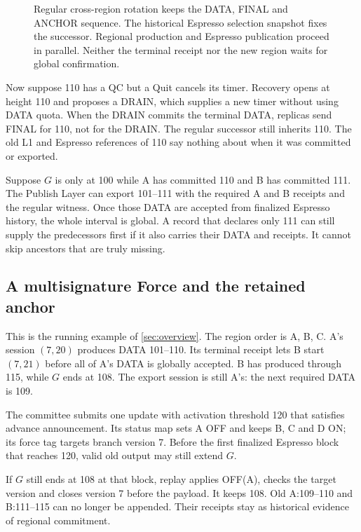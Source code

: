 \documentclass[11pt,a4paper]{article}
\begin{document}
\begin{figure}[htbp]\centering

\caption{Regular cross-region rotation keeps the DATA, FINAL and ANCHOR
sequence. The historical Espresso selection snapshot fixes the successor.
Regional production and Espresso publication proceed in parallel. Neither
the terminal receipt nor the new region waits for global confirmation.}
\label{fig:regular-cross-region}
\end{figure}
\FloatBarrier

Now suppose 110 has a QC but a Quit cancels its timer. Recovery opens at
height 110 and proposes a DRAIN, which supplies a new timer without using
DATA quota. When the DRAIN commits the terminal DATA, replicas send FINAL
for 110, not for the DRAIN. The regular successor still inherits 110. The
old L1 and Espresso references of 110 say nothing about when it was
committed or exported.

Suppose $G$ is only at 100 while A has committed 110 and B has committed
111. The Publish Layer can export 101--111 with the required A and B
receipts and the regular witness. Once those DATA are accepted from
finalized Espresso history, the whole interval is global. A record that
declares only 111 can still supply the predecessors first if it also
carries their DATA and receipts. It cannot skip ancestors that are truly
missing.

\subsection{A multisignature Force and the retained anchor}
\label{sec:force-example}
This is the running example of \cref{sec:overview}. The region order is
A, B, C. A's session $(7,20)$ produces DATA 101--110. Its terminal receipt
lets B start $(7,21)$ before all of A's DATA is globally accepted. B has
produced through 115, while $G$ ends at 108. The export session is still
A's: the next required DATA is 109.

The committee submits one update with activation threshold 120 that
satisfies advance announcement. Its status map sets A OFF and keeps B, C
and D ON; its force tag targets branch version 7. Before the first finalized Espresso block that
reaches 120, valid old output may still extend $G$.

If $G$ still ends at 108 at that block, replay applies OFF(A), checks the
target version and closes version 7 before the payload. It keeps 108. Old
A:109--110 and B:111--115 can no longer be appended. Their receipts stay
as historical evidence of regional commitment.
\end{document}
